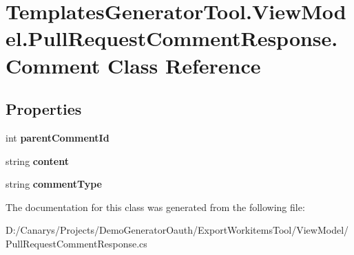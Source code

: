 \hypertarget{class_templates_generator_tool_1_1_view_model_1_1_pull_request_comment_response_1_1_comment}{}\section{Templates\+Generator\+Tool.\+View\+Model.\+Pull\+Request\+Comment\+Response.\+Comment Class Reference}
\label{class_templates_generator_tool_1_1_view_model_1_1_pull_request_comment_response_1_1_comment}
\subsection*{Properties}
\begin{DoxyCompactItemize}
\item 
\mbox{\label{class_templates_generator_tool_1_1_view_model_1_1_pull_request_comment_response_1_1_comment_a73447bbb4e40967aed9313041162908d}} 
int {\bfseries parent\+Comment\+Id}
\item 
\mbox{\label{class_templates_generator_tool_1_1_view_model_1_1_pull_request_comment_response_1_1_comment_a76fba73563f4d827619ad729cb0e0034}} 
string {\bfseries content}
\item 
\mbox{\label{class_templates_generator_tool_1_1_view_model_1_1_pull_request_comment_response_1_1_comment_a6625a83d9ba77410798a0d424b0ec0ca}} 
string {\bfseries comment\+Type}
\end{DoxyCompactItemize}


The documentation for this class was generated from the following file\+:\begin{DoxyCompactItemize}
\item 
D\+:/\+Canarys/\+Projects/\+Demo\+Generator\+Oauth/\+Export\+Workitems\+Tool/\+View\+Model/Pull\+Request\+Comment\+Response.\+cs\end{DoxyCompactItemize}
